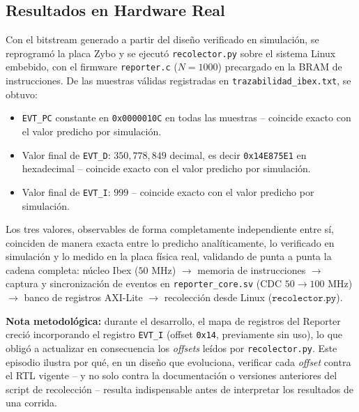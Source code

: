 
\subsection{Resultados en Hardware Real}
\label{ssec:resultados_hardware}

Con el bitstream generado a partir del diseño verificado en simulación, se
reprogramó la placa Zybo y se ejecutó \texttt{recolector.py} sobre el
sistema Linux embebido, con el firmware \texttt{reporter.c} ($N=1000$)
precargado en la BRAM de instrucciones. De las muestras válidas
registradas en \texttt{trazabilidad\_ibex.txt}, se obtuvo:
\begin{itemize}
    \item \texttt{EVT\_PC} constante en \texttt{0x0000010C} en todas las
    muestras -- coincide exacto con el valor predicho por simulación.
    \item Valor final de \texttt{EVT\_D}: $350{,}778{,}849$ decimal, es
    decir \texttt{0x14E875E1} en hexadecimal -- coincide exacto con el
    valor predicho por simulación.
    \item Valor final de \texttt{EVT\_I}: $999$ -- coincide exacto con el
    valor predicho por simulación.
\end{itemize}

Los tres valores, observables de forma completamente independiente entre
sí, coinciden de manera exacta entre lo predicho analíticamente, lo
verificado en simulación y lo medido en la placa física real, validando de
punta a punta la cadena completa: núcleo Ibex ($50\text{ MHz}$) $\rightarrow$
memoria de instrucciones $\rightarrow$ captura y sincronización de eventos
en \texttt{reporter\_core.sv} ($\text{CDC } 50 \rightarrow 100\text{ MHz}$)
$\rightarrow$ banco de registros AXI-Lite $\rightarrow$ recolección desde
Linux ($\texttt{recolector.py}$).

\textbf{Nota metodológica:} durante el desarrollo, el mapa de registros del
Reporter creció incorporando el registro \texttt{EVT\_I} (offset
\texttt{0x14}, previamente sin uso), lo que obligó a actualizar en
consecuencia los \textit{offsets} leídos por \texttt{recolector.py}. Este
episodio ilustra por qué, en un diseño que evoluciona, verificar cada
\textit{offset} contra el RTL vigente -- y no solo contra la documentación
o versiones anteriores del script de recolección -- resulta indispensable
antes de interpretar los resultados de una corrida.

